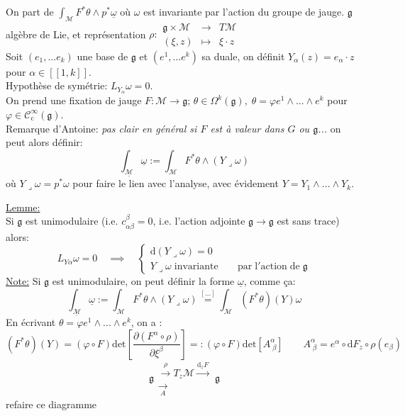 \documentclass[a4paper,11pt]{article}
\renewcommand{\d}{{\mathrm{d}}}
\newcommand{\dr}[2]{\frac{\partial {#1}}{\partial{#2}}}
\begin{document}
On part de $\int_{\mathcal M} F^*\theta\wedge p^*\underline\omega$ où $\omega$ est invariante par l'action du groupe de jauge. $\mathfrak{g}$ algèbre de Lie, et représentation $\rho: \begin{matrix}
\mathfrak g\times\mathcal M & \to & T\mathcal M\\
(\xi,z) & \mapsto & \xi \cdot z
\end{matrix}$\\
Soit $(e_1, ...e_k)$ une base de $\mathfrak g$ et $(e^1, ...e^k)$ sa duale, on définit $Y_\alpha(z) = e_\alpha\cdot z$ pour $\alpha \in [\![1,k]\!]$.\\
Hypothèse de symétrie: $\boxed{L_{Y_\alpha}\omega=0}$.\\
On prend une fixation de jauge $F:\mathcal{M}\to \mathfrak{g}$; $\theta \in \Omega^k(\mathfrak g),\; \theta = \varphi e^1\wedge...\wedge e^k$ pour $\varphi\in\mathcal{C}^\infty_\mathrm{c}(\mathfrak g)$.\\
Remarque d'Antoine: \emph{pas clair en général si $F$ est à valeur dans $G$ ou $\mathfrak g$...} on peut alors définir:
$$\int_{\underline{\mathcal M}} \underline\omega := \int_\mathcal M F^*\theta \wedge (Y\lrcorner \omega)$$
où $Y\lrcorner\omega = p^*\omega$ pour faire le lien avec l'analyse, avec évidement $Y=Y_1\wedge...\wedge Y_k$.

\noindent \underline{Lemme:}\\
Si $\mathfrak g$ est unimodulaire (i.e. $c^\beta_{\alpha\beta}=0$, i.e. l'action adjointe $\mathfrak g\to\mathfrak g$ est sans trace) alors:
$$L_{Y\alpha}\omega = 0 \quad \implies\quad
\left\{
\begin{matrix}
\d(Y\lrcorner\omega)=0\quad \;\;\,&\\
Y\lrcorner \omega \; \mathrm{invariante}&
\!\!\! \mathrm{par}\;\mathrm l'\mathrm{action}\;\mathrm{de}\;\mathfrak g
\end{matrix}
\right.$$
\underline{Note:} Si $\mathfrak g$ est unimodulaire, on peut définir la forme $\underline \omega$, comme ça:
$$\int_{\underline{\mathcal M}} \underline\omega := \int_\mathcal M F^*\theta \wedge (Y\lrcorner \omega) \overset{[...]}= \int_\mathcal M (F^*\theta) (Y) \omega$$
En écrivant $\theta = \varphi e^1\wedge...\wedge e^k$, on a :
$$(F^*\theta)(Y) = (\varphi\circ F) \mathrm{det}\left[\dr{(F^\alpha\circ \rho)}{\xi^\beta}\right]=: (\varphi\circ F) \mathrm{det}[A^\alpha_{\;\beta}] \quad \quad A^\alpha_{\;\beta} = e^\alpha \circ \d F_z \circ \rho(e_\beta)$$
$$\mathfrak{g} \begin{matrix}
\overset \rho \to T_z\mathcal M \overset{\d_zF}\to\\
\underset A \longrightarrow
\end{matrix} \mathfrak g$$
\color{red} refaire ce diagramme\color{black}
\end{document}

